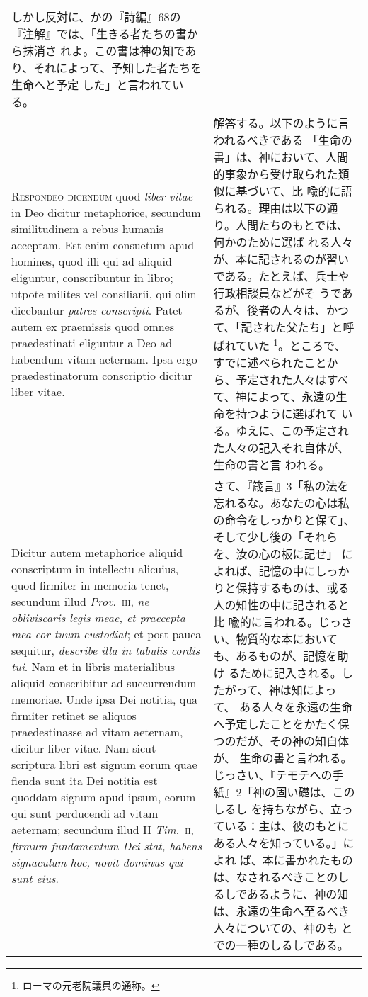 \documentclass[10pt]{jsarticle} %
\begin{document}
\begin{longtable}{p{21em}p{21em}}
しかし反対に、かの『詩編』68の『注解』では、「生きる者たちの書から抹消さ
 れよ。この書は神の知であり、それによって、予知した者たちを生命へと予定
 した」と言われている。


\\



{\scshape Respondeo dicendum} quod {\itshape liber vitae} in Deo
 dicitur metaphorice, secundum similitudinem a rebus humanis
 acceptam. Est enim consuetum apud homines, quod illi qui ad aliquid
 eliguntur, conscribuntur in libro; utpote milites vel consiliarii, qui
 olim dicebantur {\itshape patres conscripti}. Patet autem ex praemissis quod omnes
 praedestinati eliguntur a Deo ad habendum vitam aeternam. Ipsa ergo
 praedestinatorum conscriptio dicitur liber vitae. 



&

解答する。以下のように言われるべきである
「生命の書」は、神において、人間的事象から受け取られた類似に基づいて、比
 喩的に語られる。理由は以下の通り。人間たちのもとでは、何かのために選ば
 れる人々が、本に記されるのが習いである。たとえば、兵士や行政相談員などがそ
 うであるが、後者の人々は、かつて、「記された父たち」と呼ばれていた
 \footnote{ローマの元老院議員の通称。}。ところで、すでに述べられたことか
 ら、予定された人々はすべて、神によって、永遠の生命を持つように選ばれて
 いる。ゆえに、この予定された人々の記入それ自体が、生命の書と言
 われる。


\\

Dicitur autem
 metaphorice aliquid conscriptum in intellectu alicuius, quod firmiter
 in memoria tenet, secundum illud {\itshape Prov}.~{\scshape iii}, {\itshape ne obliviscaris legis meae,
 et praecepta mea cor tuum custodiat}; et post pauca sequitur, {\itshape describe
 illa in tabulis cordis tui}. Nam et in libris materialibus aliquid
 conscribitur ad succurrendum memoriae. Unde ipsa Dei notitia, qua
 firmiter retinet se aliquos praedestinasse ad vitam aeternam, dicitur
 liber vitae. Nam sicut scriptura libri est signum eorum quae fienda
 sunt ita Dei notitia est quoddam signum apud ipsum, eorum qui sunt
 perducendi ad vitam aeternam; secundum illud II {\itshape Tim}.~{\scshape ii}, {\itshape firmum
 fundamentum Dei stat, habens signaculum hoc, novit dominus qui sunt
 eius}.


&

さて、『箴言』3「私の法を忘れるな。あなたの心は私の命令をしっかりと保て」、
 そして少し後の「それらを、汝の心の板に記せ」
 によれば、記憶の中にしっかりと保持するものは、或る人の知性の中に記されると比
 喩的に言われる。じっさい、物質的な本においても、あるものが、記憶を助け
 るために記入される。したがって、神は知によって、
 ある人々を永遠の生命へ予定したことをかたく保つのだが、その神の知自体が、
 生命の書と言われる。じっさい、『テモテへの手紙』2「神の固い礎は、このしるし
 を持ちながら、立っている：主は、彼のもとにある人々を知っている。」によれ
 ば、本に書かれたものは、なされるべきことのし
 るしであるように、神の知は、永遠の生命へ至るべき人々についての、神のも
 とでの一種のしるしである。



\end{longtable}
\end{document}
